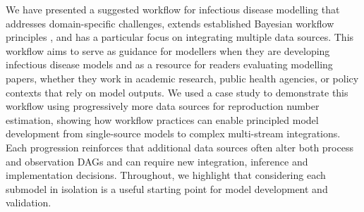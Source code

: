\documentclass{article}
\begin{document}
We have presented a suggested workflow for infectious disease modelling that addresses domain-specific challenges, extends established Bayesian workflow principles \citep{green2003highly,gelman2020bayesian}, and has a particular focus on integrating multiple data sources.
This workflow aims to serve as guidance for modellers when they are developing infectious disease models and as a resource for readers evaluating modelling papers, whether they work in academic research, public health agencies, or policy contexts that rely on model outputs.
We used a case study to demonstrate this workflow using progressively more data sources for reproduction number estimation, showing how workflow practices can enable principled model development from single-source models to complex multi-stream integrations.
Each progression reinforces that additional data sources often alter both process and observation \ac{DAG}s and can require new integration, inference and implementation decisions.
Throughout, we highlight that considering each submodel in isolation is a useful starting point for model development and validation.

\end{document}
